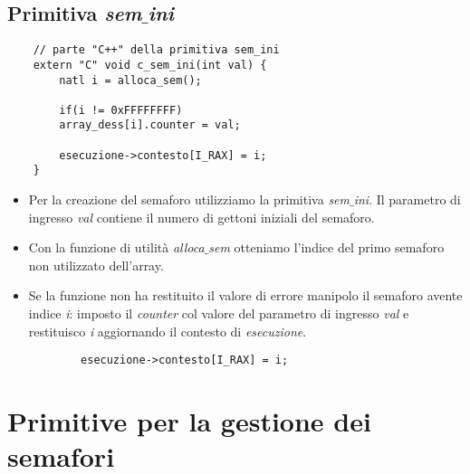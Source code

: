 \subsection{Primitiva \emph{sem$\_$ini}}
\small 
\begin{verbatim}
	// parte "C++" della primitiva sem_ini
	extern "C" void c_sem_ini(int val) {
		natl i = alloca_sem();
		
		if(i != 0xFFFFFFFF)
		array_dess[i].counter = val;
		
		esecuzione->contesto[I_RAX] = i;
	}
\end{verbatim}
\normalsize 
\begin{itemize}
	\item Per la creazione del semaforo utilizziamo la primitiva \emph{sem$\_$ini}. Il parametro di ingresso  \emph{val} contiene il numero di gettoni iniziali del semaforo.
	\item Con la funzione di utilità \emph{alloca$\_$sem} otteniamo l'indice del primo semaforo non utilizzato dell'array.
	\item Se la funzione non ha restituito il valore di errore manipolo il semaforo avente indice \emph{i}: imposto il \emph{counter} col valore del parametro di ingresso \emph{val} e restituisco \emph{i} aggiornando il contesto di \emph{esecuzione}.
	\begin{verbatim}
		esecuzione->contesto[I_RAX] = i;
	\end{verbatim}
\end{itemize}

\section{Primitive per la gestione dei semafori}

